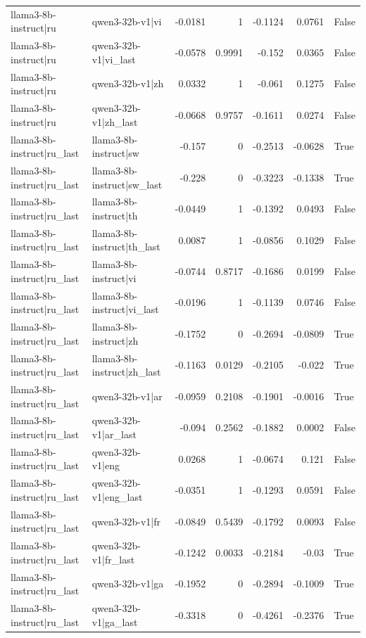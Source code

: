 \begin{table}
\begin{tabular}{l l r r r r l}
llama3-8b-instruct|ru & qwen3-32b-v1|vi & -0.0181 & 1 & -0.1124 & 0.0761 & False \\
llama3-8b-instruct|ru & qwen3-32b-v1|vi_last & -0.0578 & 0.9991 & -0.152 & 0.0365 & False \\
llama3-8b-instruct|ru & qwen3-32b-v1|zh & 0.0332 & 1 & -0.061 & 0.1275 & False \\
llama3-8b-instruct|ru & qwen3-32b-v1|zh_last & -0.0668 & 0.9757 & -0.1611 & 0.0274 & False \\
llama3-8b-instruct|ru_last & llama3-8b-instruct|sw & -0.157 & 0 & -0.2513 & -0.0628 & True \\
llama3-8b-instruct|ru_last & llama3-8b-instruct|sw_last & -0.228 & 0 & -0.3223 & -0.1338 & True \\
llama3-8b-instruct|ru_last & llama3-8b-instruct|th & -0.0449 & 1 & -0.1392 & 0.0493 & False \\
llama3-8b-instruct|ru_last & llama3-8b-instruct|th_last & 0.0087 & 1 & -0.0856 & 0.1029 & False \\
llama3-8b-instruct|ru_last & llama3-8b-instruct|vi & -0.0744 & 0.8717 & -0.1686 & 0.0199 & False \\
llama3-8b-instruct|ru_last & llama3-8b-instruct|vi_last & -0.0196 & 1 & -0.1139 & 0.0746 & False \\
llama3-8b-instruct|ru_last & llama3-8b-instruct|zh & -0.1752 & 0 & -0.2694 & -0.0809 & True \\
llama3-8b-instruct|ru_last & llama3-8b-instruct|zh_last & -0.1163 & 0.0129 & -0.2105 & -0.022 & True \\
llama3-8b-instruct|ru_last & qwen3-32b-v1|ar & -0.0959 & 0.2108 & -0.1901 & -0.0016 & True \\
llama3-8b-instruct|ru_last & qwen3-32b-v1|ar_last & -0.094 & 0.2562 & -0.1882 & 0.0002 & False \\
llama3-8b-instruct|ru_last & qwen3-32b-v1|eng & 0.0268 & 1 & -0.0674 & 0.121 & False \\
llama3-8b-instruct|ru_last & qwen3-32b-v1|eng_last & -0.0351 & 1 & -0.1293 & 0.0591 & False \\
llama3-8b-instruct|ru_last & qwen3-32b-v1|fr & -0.0849 & 0.5439 & -0.1792 & 0.0093 & False \\
llama3-8b-instruct|ru_last & qwen3-32b-v1|fr_last & -0.1242 & 0.0033 & -0.2184 & -0.03 & True \\
llama3-8b-instruct|ru_last & qwen3-32b-v1|ga & -0.1952 & 0 & -0.2894 & -0.1009 & True \\
llama3-8b-instruct|ru_last & qwen3-32b-v1|ga_last & -0.3318 & 0 & -0.4261 & -0.2376 & True \\

\end{tabular}
\end{table}
